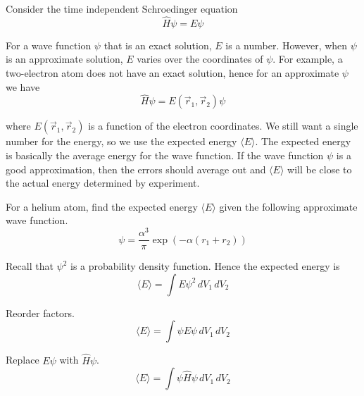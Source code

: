 \documentclass[12pt]{article}
\begin{document}
\noindent
Consider the time independent Schroedinger equation
\begin{equation*}
\hat{H}\psi=E\psi
\end{equation*}

\noindent
For a wave function $\psi$ that is an exact solution, $E$ is a number.
However, when $\psi$ is an approximate solution, $E$ varies over the coordinates of $\psi$.
For example, a two-electron atom does not have an exact solution,
hence for an approximate $\psi$ we have
\begin{equation*}
\hat{H}\psi=E(\vec{r}_1,\vec{r}_2)\psi
\end{equation*}

\noindent
where $E(\vec{r}_1,\vec{r}_2)$ is a function of the electron coordinates.
We still want a single number for the energy, so we use the expected energy $\langle E\rangle$.
The expected energy is basically the average energy for the wave function.
If the wave function $\psi$ is a good approximation,
then the errors should average out and $\langle E\rangle$ will be close to the actual energy determined by experiment.

\bigskip
\noindent
For a helium atom, find the expected energy $\langle E\rangle$ given the following approximate wave function.
\begin{equation*}
\psi=\frac{\alpha^3}{\pi}\exp\left(-\alpha (r_1+r_2)\right)
\end{equation*}

\noindent
Recall that $\psi^2$ is a probability density function.
Hence the expected energy is
\begin{equation*}
\langle E\rangle=\int E\psi^2\,dV_1\,dV_2
\end{equation*}

\noindent
Reorder factors.
\begin{equation*}
\langle E\rangle=\int\psi E\psi\,dV_1\,dV_2
\end{equation*}

\noindent
Replace $E\psi$ with $\hat{H}\psi$.
\begin{equation*}
\langle E\rangle=\int\psi\hat{H}\psi\,dV_1\,dV_2
\end{equation*}
\end{document}
